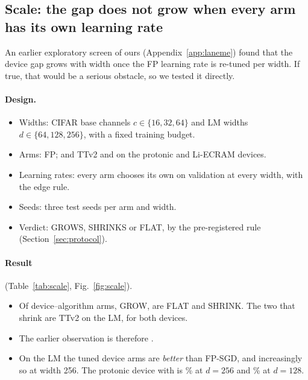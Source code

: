\subsection{Scale: the gap does not grow when every arm has its own learning rate}\label{sec:scale}
An earlier exploratory screen of ours (Appendix~\ref{app:laneme}) found that the device gap grows with width once the FP
learning rate is re-tuned per width. If true, that would be a serious obstacle, so we tested it directly.

\paragraph{Design.}
\begin{itemize}
\item Widths: CIFAR base channels $c\in\{16,32,64\}$ and LM widths $d\in\{64,128,256\}$, with a fixed training budget.
\item Arms: FP; and TTv2 and \RETwoBestchopped{} on the protonic and Li-ECRAM devices.
\item Learning rates: every arm chooses its own on validation at every width, with the edge rule.
\item Seeds: three test seeds per arm and width.
\item Verdict: GROWS, SHRINKS or FLAT, by the pre-registered rule (Section~\ref{sec:protocol}).
\end{itemize}

\paragraph{Result} (Table~\ref{tab:scale}, Fig.~\ref{fig:scale}).
\begin{itemize}
\item Of \REFourNArms{} device--algorithm arms, \REFourNGrows{} GROW, \REFourNFlat{} are FLAT and \REFourNShrinks{} SHRINK.
      The two that shrink are TTv2 on the LM, for both devices.
\item The earlier observation is therefore \textbf{\REFourConfirmed}.
\item On the LM the tuned device arms are \emph{better} than FP-SGD, and increasingly so at width 256. The protonic device with
      \RETwoBestchopped{} is \REFourLmProtonicOnenTwoZeroTwoTwoCttvTwoWTwoFiveSixGap\% at $d=256$ and
      \REFourLmProtonicOnenTwoZeroTwoTwoCttvTwoWOneTwoEightGap\% at $d=128$.
\end{itemize}

